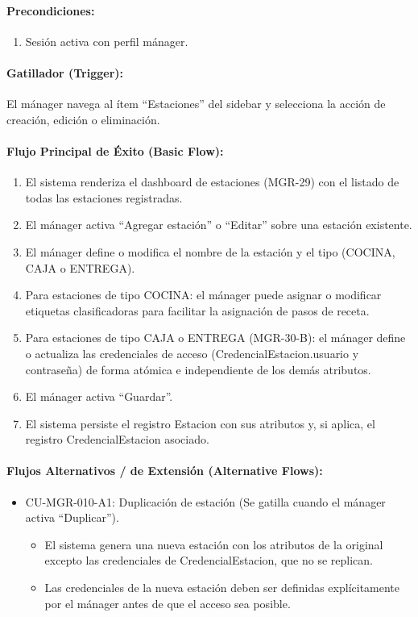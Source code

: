 \paragraph{Precondiciones:}
\begin{enumerate}
    \item[I.] Sesión activa con perfil mánager.
\end{enumerate}

\paragraph{Gatillador (Trigger):} El mánager navega al ítem ``Estaciones'' del sidebar y selecciona la acción de creación, edición o eliminación.

\paragraph{Flujo Principal de Éxito (Basic Flow):}
\begin{enumerate}
    \item[I.] El sistema renderiza el dashboard de estaciones (MGR-29) con el listado de todas las estaciones registradas.
    \item[II.] El mánager activa ``Agregar estación'' o ``Editar'' sobre una estación existente.
    \item[III.] El mánager define o modifica el nombre de la estación y el tipo (COCINA, CAJA o ENTREGA).
    \item[IV.] Para estaciones de tipo COCINA: el mánager puede asignar o modificar etiquetas clasificadoras para facilitar la asignación de pasos de receta.
    \item[V.] Para estaciones de tipo CAJA o ENTREGA (MGR-30-B): el mánager define o actualiza las credenciales de acceso (CredencialEstacion.usuario y contraseña) de forma atómica e independiente de los demás atributos.
    \item[VI.] El mánager activa ``Guardar''.
    \item[VII.] El sistema persiste el registro Estacion con sus atributos y, si aplica, el registro CredencialEstacion asociado.
\end{enumerate}

\paragraph{Flujos Alternativos / de Extensión (Alternative Flows):}
\begin{itemize}
    \item CU-MGR-010-A1: Duplicación de estación (Se gatilla cuando el mánager activa ``Duplicar'').
    \begin{itemize}
        \item El sistema genera una nueva estación con los atributos de la original excepto las credenciales de CredencialEstacion, que no se replican.
        \item Las credenciales de la nueva estación deben ser definidas explícitamente por el mánager antes de que el acceso sea posible.
    \end{itemize}
\end{itemize}

